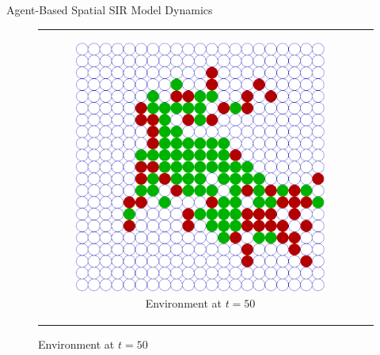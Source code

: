 \documentclass{beamer} %
\begin{document}
\begin{frame}{Agent-Based Spatial SIR Model Dynamics}
\begin{figure}
\begin{center}
	\begin{tabular}{c c}
		\begin{subfigure}[b]{0.4\textwidth}
			\centering
			\includegraphics[width=1\textwidth, angle=0]{./fig/SIR_Dunai_dt001_environment.png}
			\caption{Environment at $t = 50$}
			\label{fig:sir_dunai_env}
		\end{subfigure}
    	
    	&
  

\end{tabular}
\end{center}
\end{figure}
\end{frame}
\end{document}
